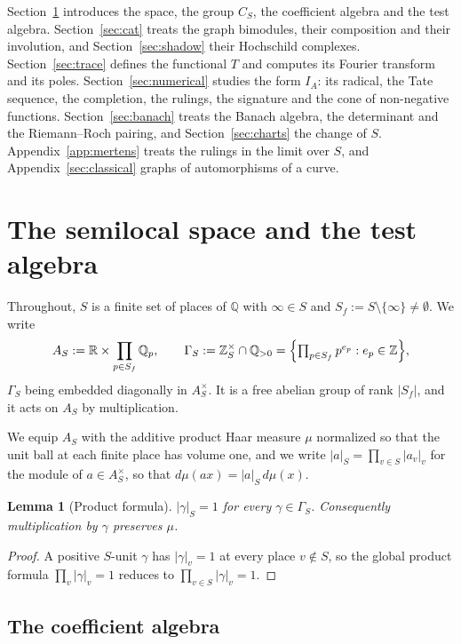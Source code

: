 \documentclass[11pt]{amsart}
\newtheorem{lemma}[theorem]{Lemma}
\theoremstyle{definition}
\theoremstyle{remark}
\newcommand{\R}{\mathbb R}
\newcommand{\Z}{\mathbb Z}
\newcommand{\Q}{\mathbb Q}
\begin{document}
Section~\ref{sec:carrier} introduces the space, the group $C_S$, the
coefficient algebra and the test algebra.  Section~\ref{sec:cat} treats the
graph bimodules, their composition and their involution, and
Section~\ref{sec:shadow} their Hochschild complexes.
Section~\ref{sec:trace} defines the functional $T$ and computes its Fourier
transform and its poles.  Section~\ref{sec:numerical} studies the form $I_A$:
its radical, the Tate sequence, the completion, the rulings, the signature
and the cone of non-negative functions.  Section~\ref{sec:banach} treats the
Banach algebra, the determinant and the Riemann--Roch pairing, and
Section~\ref{sec:charts} the change of $S$.  Appendix~\ref{app:mertens}
treats the rulings in the limit over $S$, and Appendix~\ref{sec:classical}
graphs of automorphisms of a curve.

\section{The semilocal space and the test algebra}\label{sec:carrier}

Throughout, $S$ is a finite set of places of $\Q$ with $\infty\in S$ and
$S_f:=S\setminus\{\infty\}\ne\emptyset$.  We write
\[
A_S:=\R\times\prod_{p\in S_f}\Q_p,\qquad
\Gamma_S:=\Z_S^{\times}\cap\Q_{>0}
=\Bigl\{\textstyle\prod_{p\in S_f}p^{e_p}: e_p\in\Z\Bigr\},
\]
$\Gamma_S$ being embedded diagonally in $A_S^{\times}$.  It is a free abelian
group of rank $|S_f|$, and it acts on $A_S$ by multiplication.

We equip $A_S$ with the additive product Haar measure $\mu$ normalized so that
the unit ball at each finite place has volume one, and we write
$|a|_S=\prod_{v\in S}|a_v|_v$ for the module of $a\in A_S^{\times}$, so that
$d\mu(ax)=|a|_S\,d\mu(x)$.

\begin{lemma}[Product formula]\label{lem:prodformula}
$|\gamma|_S=1$ for every $\gamma\in\Gamma_S$.  Consequently multiplication by
$\gamma$ preserves $\mu$.
\end{lemma}

\begin{proof}
A positive $S$-unit $\gamma$ has $|\gamma|_v=1$ at every place $v\notin S$, so
the global product formula $\prod_{v}|\gamma|_v=1$ reduces to
$\prod_{v\in S}|\gamma|_v=1$.
\end{proof}

\subsection{The coefficient algebra}
\end{document}
